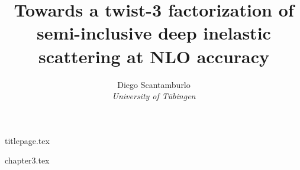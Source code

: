 \documentclass[12pt,oneside,openany]{report}
\title{Towards a twist-3 factorization of semi-inclusive deep inelastic scattering at NLO accuracy}
\author{Diego Scantamburlo\\\textit{University of Tübingen}}
\begin{document}
{titlepage.tex}


{chapter3.tex}

\printbibliography
\end{document}
